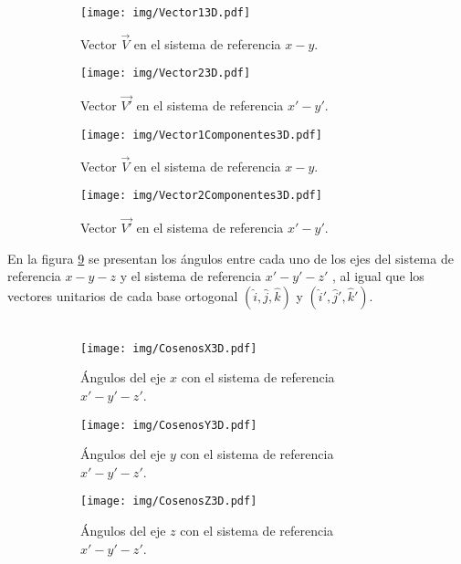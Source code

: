 \documentclass[12pt,letterpaper, twoside, openany]{article}
\begin{document}
\begin{figure}[H]
	\centering
	\begin{subfigure}[l]{0.450\textwidth}
		\texttt{[image: img/Vector13D.pdf]}
		\caption{Vector $\overset{\rightarrow}{V}$ en el sistema de referencia $x-y$.}
		\label{vector13d}
	\end{subfigure}
	\hspace{.5 cm}
	\begin{subfigure}[r]{0.450\textwidth}
		\texttt{[image: img/Vector23D.pdf]}
		\caption{Vector $\overset{\rightarrow}{V'}$ en el sistema de referencia $x'-y'$.}
		\label{vector23d}
	\end{subfigure}	
%
	\begin{subfigure}[l]{0.450\textwidth}
		\texttt{[image: img/Vector1Componentes3D.pdf]}
		\caption{Vector $\overset{\rightarrow}{V}$ en el sistema de referencia $x-y$.}
		\label{vector1comp3d}
	\end{subfigure}
	\hspace{.5 cm}
	\begin{subfigure}[r]{0.450\textwidth}
		\texttt{[image: img/Vector2Componentes3D.pdf]}
		\caption{Vector $\overset{\rightarrow}{V'}$ en el sistema de referencia $x'-y'$.}
		\label{vector2comp3d}
	\end{subfigure}	
	\caption{}
	\label{directores}
\end{figure}
%
%
%
%
%
En la figura \ref{directorestodos} se presentan los ángulos entre cada uno de los ejes del sistema de referencia $x-y-z$ y el sistema de referencia $x'-y'-z'$ , al igual que los vectores unitarios de cada base ortogonal $\left( \hat{i}, \hat{j}, \hat{k} \right)$ y $\left( \hat{i}', \hat{j}', \hat{k}' \right)$.\\\\

\begin{figure}[H]
	\centering
	\begin{subfigure}[l]{0.450\textwidth}
		\texttt{[image: img/CosenosX3D.pdf]}
		\caption{Ángulos del eje $x$ con el sistema de referencia $x'-y'-z'$.}
		\label{cosx3d}
	\end{subfigure}
	\hspace{.5 cm}
	\begin{subfigure}[r]{0.450\textwidth}
		\texttt{[image: img/CosenosY3D.pdf]}
		\caption{Ángulos del eje $y$ con el sistema de referencia $x'-y'-z'$.}
		\label{cosy3d}
	\end{subfigure}
	\begin{subfigure}[r]{0.450\textwidth}
		\texttt{[image: img/CosenosZ3D.pdf]}
		\caption{Ángulos del eje $z$ con el sistema de referencia $x'-y'-z'$.}
		\label{cosz3d}
	\end{subfigure}	
	\caption{}
	\label{directorestodos}
\end{figure}
\end{document}
